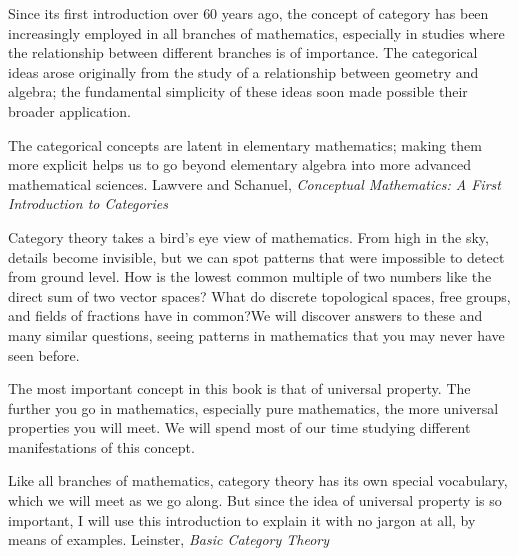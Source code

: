 \documentclass[11pt,openany]{book}
\begin{document}
\begin{boxquote}
Since its first introduction over $60$ years ago, the concept of category has been
increasingly employed in all branches of mathematics, especially in studies where the
relationship between different branches is of importance. The categorical ideas arose
originally from the study of a relationship between geometry and algebra; the
fundamental simplicity of these ideas soon made possible their broader application.
\par
The categorical concepts are latent in elementary mathematics; making them more
explicit helps us to go beyond elementary algebra into more advanced mathematical
sciences.
\tcblower
{Lawvere and Schanuel, 
\textit{Conceptual Mathematics: 
A First Introduction to Categories}~\cite{lawvere_schanuel_2009_conceptual_math}}
\end{boxquote}

\begin{boxquote}
Category theory takes a bird’s eye view of mathematics. From high in the sky,
details become invisible, but we can spot patterns that were impossible to detect
from ground level. How is the lowest common multiple of two numbers
like the direct sum of two vector spaces? What do discrete topological spaces,
free groups, and fields of fractions have in common?We will discover answers
to these and many similar questions, seeing patterns in mathematics that you
may never have seen before.
\par
The most important concept in this book is that of universal property. The
further you go in mathematics, especially pure mathematics, the more universal
properties you will meet. We will spend most of our time studying different
manifestations of this concept.
\par
Like all branches of mathematics, category theory has its own special vocabulary,
which we will meet as we go along. But since the idea of universal
property is so important, I will use this introduction to explain it with no jargon
at all, by means of examples.
\tcblower
{Leinster, \textit{Basic Category Theory}~\cite{leinster_2016_basic_category_theory}}
\end{boxquote}
\end{document}
